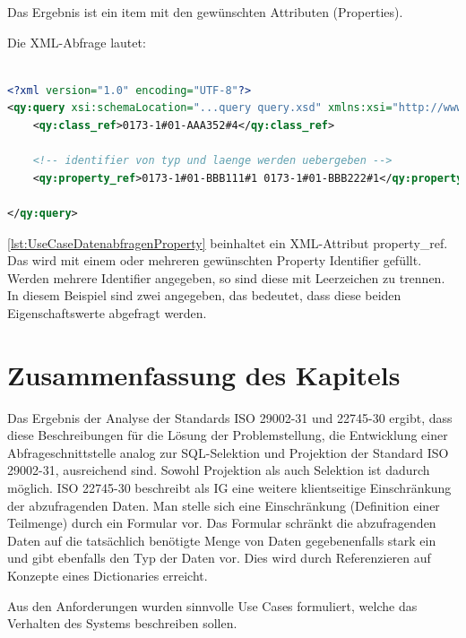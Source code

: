 Das Ergebnis ist ein \gls{item} mit den gewünschten Attributen (Properties). 

Die XML-Abfrage lautet:
\begin{lstlisting}[caption=Query Beispiel - Daten abfragen mit Propertyeinschränkung (Projektion), language=XML, label=lst:UseCaseDatenabfragenProperty]

<?xml version="1.0" encoding="UTF-8"?>
<qy:query xsi:schemaLocation="...query query.xsd" xmlns:xsi="http://www.w3.org/2001/XMLSchema-instance" xmlns:cat="...catalogue" xmlns:val="...value" xmlns:qy="...query" xmlns:bas="...basic">
	<qy:class_ref>0173-1#01-AAA352#4</qy:class_ref>
	
	<!-- identifier von typ und laenge werden uebergeben -->
	<qy:property_ref>0173-1#01-BBB111#1 0173-1#01-BBB222#1</qy:property_ref> 
	
</qy:query>
\end{lstlisting}

\autoref{lst:UseCaseDatenabfragenProperty} beinhaltet ein XML-Attribut property\_ref. Das wird mit einem oder mehreren gewünschten Property Identifier gefüllt. Werden mehrere Identifier angegeben, so sind diese mit Leerzeichen zu trennen. In diesem Beispiel sind zwei angegeben, das bedeutet, dass diese beiden Eigenschaftswerte abgefragt werden.


\section{Zusammenfassung des Kapitels}

Das Ergebnis der Analyse der Standards ISO 29002-31 und 22745-30 ergibt, dass diese Beschreibungen für die Lösung der Problemstellung, die Entwicklung einer \gls{Abfrageschnittstelle} analog zur SQL-Selektion und Projektion der Standard ISO 29002-31, ausreichend sind. Sowohl Projektion als auch Selektion ist dadurch möglich. ISO 22745-30 beschreibt als \gls{IG} eine weitere klientseitige Einschränkung der abzufragenden Daten. Man stelle sich eine Einschränkung (Definition einer Teilmenge) durch ein Formular vor. Das Formular schränkt die abzufragenden Daten auf die tatsächlich benötigte Menge von Daten gegebenenfalls stark ein und gibt ebenfalls den Typ der Daten vor. Dies wird durch Referenzieren auf Konzepte eines Dictionaries erreicht.

Aus den Anforderungen wurden sinnvolle \glspl{Use Case} formuliert, welche das Verhalten des Systems beschreiben sollen.  
